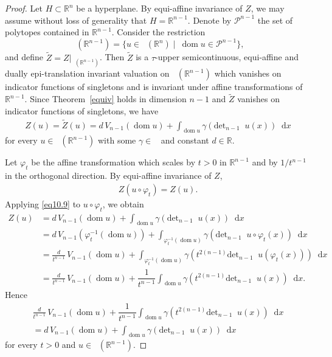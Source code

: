 \documentclass[11pt]{article}
\theoremstyle{definition} %
\newcommand{\dif}{\mathop{}\!\mathrm{d}}
\DeclareMathOperator{\dom}{dom}
\DeclareMathOperator{\D}{D^2}
\DeclareMathOperator{\LP}{Conv_{lp}}
\DeclareMathOperator{\conc}{Conc([0,\infty))}
\begin{document}
\begin{proof}
Let $H\subset \mathbb{R}^n$ be a hyperplane. By equi-affine invariance of $Z$, we may assume without loss of generality that $H = \mathbb{R}^{n-1}$.
 Denote by $\mathcal{P}^{n-1}$ the set of polytopes contained in $\mathbb{R}^{n-1}$. Consider the restriction
$$\LP(\mathbb{R}^{n-1})=\{u\in\LP(\mathbb{R}^n)\mid \ \dom u \in \mathcal{P}^{n-1}\},$$
and define $\tilde{Z} = Z|_{\LP(\mathbb{R}^{n-1})}$. Then $\tilde{Z}$ is a $\tau$-upper semicontinuous, equi-affine and dually epi-translation invariant valuation on $\LP(\mathbb{R}^{n-1})$ which vanishes on indicator functions of singletons and is invariant under affine transformations of $\mathbb{R}^{n-1}$. Since Theorem~\ref{equiv} holds in dimension $n-1$ and $\tilde{Z}$ vanishes on indicator functions of singletons, we have
\begin{align}\label{eq10.9}
    Z(u) = \tilde{Z}(u) = d \,V_{n-1}(\dom u) + \int_{\dom u} \gamma(\mbox{det}_{n-1} \D u(x))  \dif x
\end{align}
for every $u \in \LP(\mathbb{R}^{n-1})$ with some $\gamma \in \conc$ and constant $d\in\mathbb{R}$.



Let $\varphi_t$ be the affine transformation which scales by $t>0$ in $\mathbb{R}^{n-1}$ and by $1/t^{n-1}$ in the orthogonal direction. By equi-affine invariance of $Z$,
\begin{align*}
    Z(u \circ \varphi_t) = Z(u).
\end{align*}
Applying \eqref{eq10.9} to $u \circ \varphi_t$, we obtain
\begin{align}
\nonumber Z(u) & =  d\, V_{n-1}(\dom u)+\int_{\dom u} \gamma(\mbox{det}_{n-1}\D u(x))\dif x\\
\nonumber& = d\,V_{n-1}(\varphi_t^{-1}(\dom u))+\int_{\varphi^{-1}_t(\dom u) } \gamma (\mbox{det}_{n-1} \D u\circ \varphi_t(x))\dif x \\
\nonumber & = \frac{d}{t^{n-1}}\, V_{n-1}(\dom u)+\int_{\varphi^{-1}_t(\dom u)} \gamma\left(t^{2(n-1)}\mbox{det}_{n-1} \D u( \varphi_t(x))\right)\dif x\\
\nonumber & = \frac{d}{t^{n-1}}\, V_{n-1}(\dom u)+\dfrac{1}{t^{n-1}}\int_{\dom u} \gamma \left(t^{2(n-1)}\mbox{det}_{n-1} \D u( x)\right)\dif x.
\end{align}
Hence
\begin{multline}\label{t}
\frac{d}{t^{n-1}}\, V_{n-1}(\dom u)+\dfrac{1}{t^{n-1}}\int_{\dom u} \gamma \left(t^{2(n-1)}\mbox{det}_{n-1} \D u( x)\right)\dif x\\= d\, V_{n-1}(\dom u)+ \int_{\dom u} \gamma(\mbox{det}_{n-1}\D u(x))\dif x    
\end{multline}
for every $t>0$ and $u\in \LP(\mathbb{R}^{n-1})$. 




\end{proof}
\end{document}
